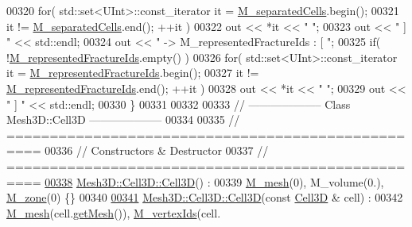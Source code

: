 \begin{DoxyCode}
00320         \textcolor{keywordflow}{for}( std::set<UInt>::const\_iterator it = \hyperlink{classFVCode3D_1_1Mesh3D_1_1Facet3D_a17706f1909c2479234a70c5e8bc440dd}{M\_separatedCells}.begin();
00321                 it != \hyperlink{classFVCode3D_1_1Mesh3D_1_1Facet3D_a17706f1909c2479234a70c5e8bc440dd}{M\_separatedCells}.end(); ++it )
00322             out << *it << \textcolor{stringliteral}{" "};
00323     out << \textcolor{stringliteral}{" ] "} << std::endl;
00324     out << \textcolor{stringliteral}{"  -> M\_representedFractureIds : [ "};
00325     \textcolor{keywordflow}{if}( !\hyperlink{classFVCode3D_1_1Mesh3D_1_1Facet3D_ad727210646d148f7af81755fb086310c}{M\_representedFractureIds}.empty() )
00326         \textcolor{keywordflow}{for}( std::set<UInt>::const\_iterator it = \hyperlink{classFVCode3D_1_1Mesh3D_1_1Facet3D_ad727210646d148f7af81755fb086310c}{M\_representedFractureIds}.begin();
00327                 it != \hyperlink{classFVCode3D_1_1Mesh3D_1_1Facet3D_ad727210646d148f7af81755fb086310c}{M\_representedFractureIds}.end(); ++it )
00328             out << *it << \textcolor{stringliteral}{" "};
00329     out << \textcolor{stringliteral}{" ] "} << std::endl;
00330 \}
00331 
00332 
00333 \textcolor{comment}{// --------------------   Class Mesh3D::Cell3D   --------------------}
00334 
00335 \textcolor{comment}{// ==================================================}
00336 \textcolor{comment}{// Constructors & Destructor}
00337 \textcolor{comment}{// ==================================================}
\hypertarget{Mesh3D_8cpp_source.tex_l00338}{}\hyperlink{classFVCode3D_1_1Mesh3D_1_1Cell3D_a975daf83e16e8ee91f06e346a6fbb37d}{00338} \hyperlink{classFVCode3D_1_1Mesh3D_1_1Cell3D_a975daf83e16e8ee91f06e346a6fbb37d}{Mesh3D::Cell3D::Cell3D}() :
00339         \hyperlink{classFVCode3D_1_1Mesh3D_1_1Facet3D_adf8cf45ade4804389de18428aea4969d}{M\_mesh}(0), M\_volume(0.), \hyperlink{classFVCode3D_1_1Mesh3D_1_1Facet3D_afdbaf5ef57c9020b773f4fcf1e6131bb}{M\_zone}(0) \{\}
00340 
\hypertarget{Mesh3D_8cpp_source.tex_l00341}{}\hyperlink{classFVCode3D_1_1Mesh3D_1_1Cell3D_aab1f2e91f0e2c6a4dc366b114802cbff}{00341} \hyperlink{classFVCode3D_1_1Mesh3D_1_1Cell3D_a975daf83e16e8ee91f06e346a6fbb37d}{Mesh3D::Cell3D::Cell3D}(\textcolor{keyword}{const} \hyperlink{classFVCode3D_1_1Mesh3D_1_1Cell3D}{Cell3D} & cell) :
00342         \hyperlink{classFVCode3D_1_1Mesh3D_1_1Cell3D_a5f593479ad61eb1a043b7ec977db39bb}{M\_mesh}(cell.\hyperlink{classFVCode3D_1_1Mesh3D_1_1Cell3D_a0b189bebb77030c320b3d51b873de936}{getMesh}()), \hyperlink{classFVCode3D_1_1Mesh3D_1_1Cell3D_a1c43369fa1a00208ff3293aad35a70aa}{M\_vertexIds}(cell.

\end{DoxyCode}
